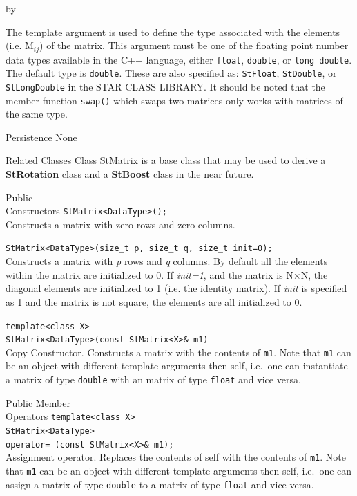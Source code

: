 \documentclass[twoside]{article}
\newcommand{\comp}[1]{\texttt{#1}}%
\newcommand{\entrylabel}[1]{\mbox{\textbf{{#1}}}\hfil}%
\newenvironment{entry}
{\begin{list}{}%
    {\renewcommand{\makelabel}{\entrylabel}%
     \setlength{\labelwidth}{90pt}%
     \setlength{\leftmargin}{\labelwidth}
     \advance\leftmargin by \labelsep%
      }%
    }%
  {\end{list}}
\newcommand{\Entrylabel}[1]%
{\raisebox{0pt}[1ex][0pt]{\makebox[\labelwidth][l]%
    {\parbox[t]{\labelwidth}{\hspace{0pt}\textbf{{#1}}}}}}
\newenvironment{Entry}%
{\renewcommand{\entrylabel}{\Entrylabel}\begin{entry}}%
  {\end{entry}}
\begin{document}
\begin{description}
\begin{Entry}
    The template argument is used to define the type associated with
    the elements (i.e. M$_{ij}$) of the matrix.  This argument must
    be one of the floating point number data types available in
    the C++ language, either \comp{float}, \comp{double},
    or \comp{long double}. The default type is \comp{double}.
    These are also specified as:
    \comp{StFloat}, \comp{StDouble}, or \comp{StLongDouble} in
    the STAR CLASS LIBRARY.  It should be noted that the member function
    \comp{swap()} which swaps two matrices only works with matrices of
    the same type.
    
\item[Persistence]
    None

\item[Related Classes]
    Class StMatrix is a base class that may be used to derive
    a {\bf StRotation} class
    and a {\bf StBoost} class in the near future.

\item[Public\\ Constructors]
    \verb+StMatrix<DataType>();+ \\
    Constructs a matrix with zero rows and zero columns.
    
    \verb+StMatrix<DataType>(size_t p, size_t q, size_t init=0);+ \\
    Constructs a matrix with {\em p} rows and {\em q} columns.  By
    default all the elements within the matrix are initialized
    to 0.  If {\em init=1}, and the matrix is N$\times$N, the diagonal
    elements are initialized to 1 (i.e. the identity matrix).  If
    {\em init} is specified as 1 and the matrix is not square, the
    elements are all initialized to 0.

    \verb+template<class X>+\\
    \verb+StMatrix<DataType>(const StMatrix<X>& m1)+\\
    Copy Constructor. Constructs a matrix with the contents of \comp{m1}.
    Note that \comp{m1} can be an object with different
    template arguments then self, i.e.~one can instantiate
    a matrix of type \comp{double} with an matrix of type
    \comp{float} and vice versa.   
    
\item[Public Member\\ Operators]
    \verb+template<class X>+\\
    \verb+StMatrix<DataType>+\\
    \verb+operator= (const StMatrix<X>& m1);+ \\
    Assignment operator. Replaces the contents of self with the
    contents of \comp{m1}.
    Note that \comp{m1} can be an object with different
    template arguments then self, i.e.~one can assign
    a matrix of type \comp{double} to a matrix of type
    \comp{float} and vice versa.  
    

\end{Entry}
\end{description}
\end{document}

